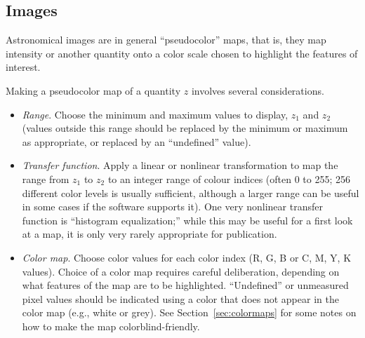 \documentclass[letterpaper,11pt]{article}
\begin{document}
\subsection{Images}

Astronomical images are in general ``pseudocolor'' maps, that is, they map
intensity or another quantity onto a color scale chosen to highlight the
features of interest.  

Making a pseudocolor map of a quantity $z$ involves several considerations.

\begin{itemize}
\item
{\it Range}. Choose the minimum and maximum values to
display, $z_1$ and $z_2$ (values outside this range should be replaced by the
minimum or maximum as appropriate, or replaced by an ``undefined'' value).

\item
{\it Transfer function\/}. Apply a linear or nonlinear
transformation to map the range from $z_1$ to $z_2$ to an integer range of
colour indices (often 0 to 255; 256 different color levels is usually
sufficient, although a larger range can be useful in some cases if the
software supports it). One very nonlinear transfer function is ``histogram
equalization;'' while this may be useful for  a first look at a map, it is
only very rarely appropriate for publication.

\item
{\it Color map\/}. Choose color values for each color
index (R, G, B or C, M, Y, K values). Choice of a color map requires careful
deliberation, depending on what features of the map are to be highlighted.
``Undefined'' or unmeasured pixel values should be indicated using a color
that does not appear in the color map (e.g., white or grey).
See Section~\ref{sec:colormaps} for some notes on how to make the map colorblind-friendly.

\end{itemize}

%
%
\end{document}
